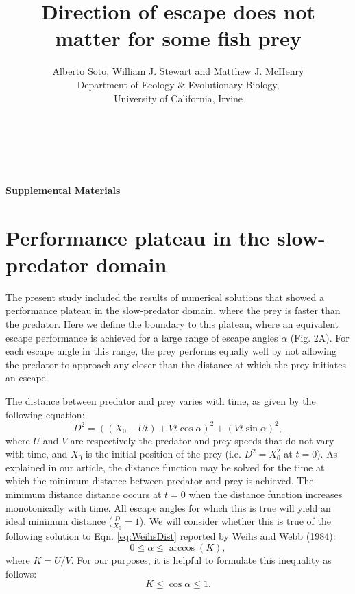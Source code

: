 \documentclass[12pt]{article}
\title{Direction of escape does not matter for some fish prey}
\author{Alberto Soto, William J. Stewart and Matthew J. McHenry\\
  Department of Ecology \& Evolutionary Biology,\\
  University of California, Irvine\\ \\ \\ \\}
\begin{document}

{\LARGE \textbf{Supplemental Materials}}


\section{Performance plateau in the slow-predator domain}
The present study included the results of numerical solutions that showed a performance plateau in the slow-predator domain, where the prey is faster than the predator. 
Here we define the boundary to this plateau, where an equivalent escape performance is achieved for a large range of escape angles $\alpha$ (Fig. 2A).
For each escape angle in this range, the prey performs equally well by not allowing the predator to approach any closer than the distance at which the prey initiates an escape.   

The distance between predator and prey varies with time, as given by the following equation:
%
\begin{equation}
D^2 = ((X_0 - Ut) + Vt\cos\alpha)^2 + (Vt\sin\alpha)^2,
\label{eq:WeihsDist}
\end{equation}
%
where $U$ and $V$ are respectively the predator and prey speeds that do not vary with time, and $X_0$ is the initial position of the prey (i.e. $D^2 = X_0^2$ at $t=0$). 
As explained in our article, the distance function may be solved for the time at which the minimum distance between predator and prey is achieved.  
The minimum distance distance occurs at $t=0$ when the distance function increases monotonically with time. 
All escape angles for which this is true will yield an ideal minimum distance ($\frac{D}{X_0}=1$).
We will consider whether this is true of the following solution to Eqn. \ref{eq:WeihsDist} reported by Weihs and Webb (1984):
%
\begin{equation}
0\leq \alpha \leq \arccos (K),
\label{eq:alphabound}
\end{equation}
where $K = U/V$. For our purposes, it is helpful to formulate this inequality as follows:
%
\begin{equation}
K \leq \cos\alpha \leq 1.
\label{eq:cosinebound}
\end{equation} 
%
\end{document}
